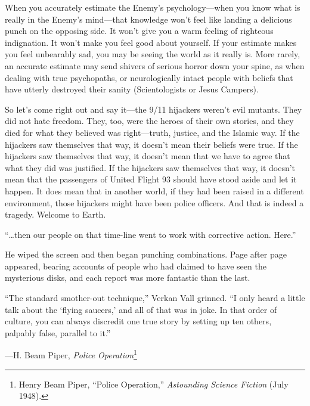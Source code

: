 {
 When you accurately estimate the Enemy's
psychology---when you know what is really in the
Enemy's mind---that knowledge won't
feel like landing a delicious punch on the opposing side. It
won't give you a warm feeling of righteous indignation.
It won't make you feel good about yourself. If your
estimate makes you feel unbearably sad, you may be seeing the world as
it really is. More rarely, an accurate estimate may send shivers of
serious horror down your spine, as when dealing with true psychopaths,
or neurologically intact people with beliefs that have utterly
destroyed their sanity (Scientologists or Jesus Campers).}

{
 So let's come right out and say it---the 9/11
hijackers weren't evil mutants. They did not hate
freedom. They, too, were the heroes of their own stories, and they died
for what they believed was right---truth, justice, and the Islamic way.
If the hijackers saw themselves that way, it doesn't
mean their beliefs were true. If the hijackers saw themselves that way,
it doesn't mean that we have to agree that what they
did was justified. If the hijackers saw themselves that way, it
doesn't mean that the passengers of United Flight 93
should have stood aside and let it happen. It does mean that in another
world, if they had been raised in a different environment, those
hijackers might have been police officers. And that is indeed a
tragedy. Welcome to Earth.}

\myendsectiontext


{
 ``\ldots then our people on that time-line went to
work with corrective action. Here.''}

{
 He wiped the screen and then began punching combinations. Page
after page appeared, bearing accounts of people who had claimed to have
seen the mysterious disks, and each report was more fantastic than the
last.}

{
 ``The standard smother-out
technique,'' Verkan Vall grinned.
``I only heard a little talk about the
`flying saucers,' and all of that was in
joke. In that order of culture, you can always discredit one true story
by setting up ten others, palpably false, parallel to
it.''}

{\raggedleft
 {}---H. Beam Piper, \textit{Police Operation}\footnote{Henry Beam Piper, ``Police
Operation,'' \textit{Astounding Science Fiction}
(July 1948).}
\par}


\bigskip

